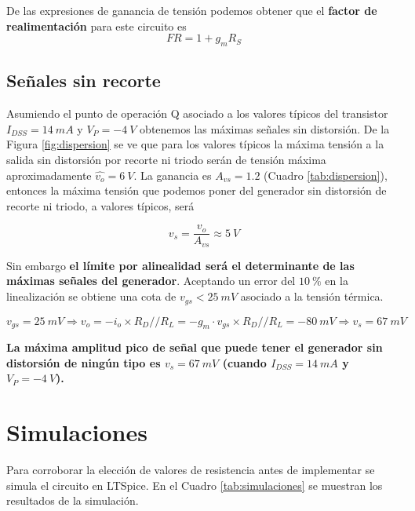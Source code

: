 \documentclass[a4paper, 10pt, spanish]{article}
\begin{document}
De las expresiones de ganancia de tensión podemos obtener que el \textbf{factor de realimentación} para este circuito es
\begin{equation}
	FR = 1+g_mR_S
	\end{equation}

\newpage
\subsection{Señales sin recorte}\label{sec:distorsiones}

Asumiendo el punto de operación Q asociado a los valores típicos del transistor $I_{DSS} = 14\ mA$ y $V_P = -4\ V$ obtenemos las máximas señales sin distorsión. De la Figura \ref{fig:dispersion} se ve que para los valores típicos la máxima tensión a la salida sin distorsión por recorte ni triodo serán de tensión máxima aproximadamente $\hat{v_o} = 6\ V$. La ganancia es $A_{vs} = 1.2$ (Cuadro \ref{tab:dispersion}), entonces la máxima tensión que podemos poner del generador sin distorsión de recorte ni triodo, a valores típicos, será

\begin{equation}
	v_s = \frac{v_o}{A_{vs}} \approx 5\ V \nonumber
	\end{equation}

Sin embargo \textbf{el límite por alinealidad será el determinante de las máximas señales del generador}. Aceptando un error del $10\ \%$ en la linealización se obtiene una cota de $v_{gs} < 25\ mV$ asociado a la tensión térmica.

\begin{equation}
	v_{gs} = 25\ mV \Rightarrow v_o = -i_o\times R_D//R_L = -g_m\cdot v_{gs} \times R_D//R_L = - 80\ mV \Rightarrow v_s = 67\ mV
	\end{equation}

\textbf{La máxima amplitud pico de señal que puede tener el generador sin distorsión de ningún tipo es $v_s = 67\ mV$ (cuando $I_{DSS} = 14\ mA$ y $V_P = -4\ V$).}




\clearpage

\section{Simulaciones}

Para corroborar la elección de valores de resistencia antes de implementar se simula el circuito en LTSpice. En el Cuadro \ref{tab:simulaciones} se muestran los resultados de la simulación.
\end{document}
